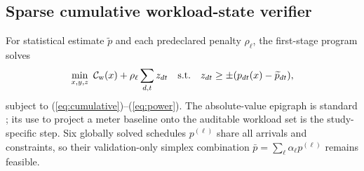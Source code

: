 \documentclass[10pt,journal]{IEEEtran}
\begin{document}
\subsection{Sparse cumulative workload-state verifier}

For statistical estimate $\widetilde p$ and each predeclared penalty $\rho_\ell$,
the first-stage program solves
\begin{equation}
 \min_{x,y,z}\ \mathcal C_{\rm w}(x)+\rho_\ell\sum_{d,t}z_{dt}
 \quad {\rm s.t.}\quad
 z_{dt}\geq\pm(p_{dt}(x)-\widetilde p_{dt}),
 \label{eq:projection}
\end{equation}
subject to (\ref{eq:cumulative})--(\ref{eq:power}). The absolute-value
epigraph is standard \cite{boyd2004convex}; its use to project a meter
baseline onto the auditable workload set is the study-specific step. Six
globally solved schedules $p^{(\ell)}$ share all arrivals and constraints, so
their validation-only simplex combination
$\bar p=\sum_\ell\alpha_\ell p^{(\ell)}$ remains feasible.
\end{document}

